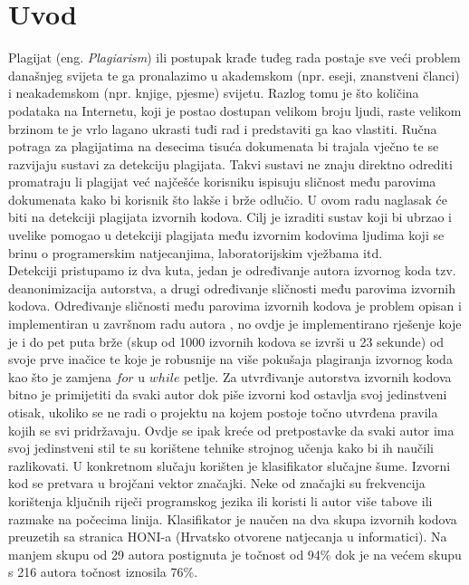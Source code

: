 \chapter*{Uvod}

	Plagijat (eng. \textit{Plagiarism}) ili postupak krađe tuđeg rada postaje sve veći problem današnjeg svijeta te ga pronalazimo u akademskom (npr. eseji, znanstveni članci) i neakademskom (npr. knjige, pjesme) svijetu. Razlog tomu je što količina podataka na Internetu, koji je postao dostupan velikom broju ljudi, raste velikom brzinom te je vrlo lagano ukrasti tuđi rad i predstaviti ga kao vlastiti. Ručna potraga za plagijatima na desecima tisuća dokumenata bi trajala vječno te se razvijaju sustavi za detekciju plagijata. Takvi sustavi ne znaju direktno odrediti promatraju li plagijat već najčešće korisniku ispisuju sličnost među parovima dokumenata kako bi korisnik što lakše i brže odlučio. U ovom radu naglasak će biti na detekciji plagijata izvornih kodova. Cilj je izraditi sustav koji bi ubrzao i uvelike pomogao u detekciji plagijata među izvornim kodovima ljudima koji se brinu o programerskim natjecanjima, laboratorijskim vježbama itd. \\

	Detekciji pristupamo iz dva kuta, jedan je određivanje autora izvornog koda tzv. deanonimizacija autorstva, a drugi određivanje sličnosti među parovima izvornih kodova. Određivanje sličnosti među parovima izvornih kodova je problem opisan i implementiran u završnom radu autora \cite{plagijator}, no ovdje je implementirano rješenje koje je i do pet puta brže (skup od 1000 izvornih kodova se izvrši u 23 sekunde) od svoje prve inačice te koje je robusnije na više pokušaja plagiranja izvornog koda kao što je zamjena $for$ u $while$ petlje. Za utvrđivanje autorstva izvornih kodova bitno je primijetiti da svaki autor dok piše izvorni kod ostavlja svoj jedinstveni otisak, ukoliko se ne radi o projektu na kojem postoje točno utvrđena pravila kojih se svi pridržavaju. Ovdje se ipak kreće od pretpostavke da svaki autor ima svoj jedinstveni stil te su korištene tehnike strojnog učenja kako bi ih naučili razlikovati. U konkretnom slučaju korišten je klasifikator slučajne šume. Izvorni kod se pretvara u brojčani vektor značajki. Neke od značajki su frekvencija korištenja ključnih riječi programskog jezika ili koristi li autor više tabove ili razmake na počecima linija. Klasifikator je naučen na dva skupa izvornih kodova preuzetih sa stranica HONI-a (Hrvatsko otvorene natjecanja u informatici). Na manjem skupu od 29 autora postignuta je točnost od 94\% dok je na većem skupu s 216 autora točnost iznosila 76\%.

